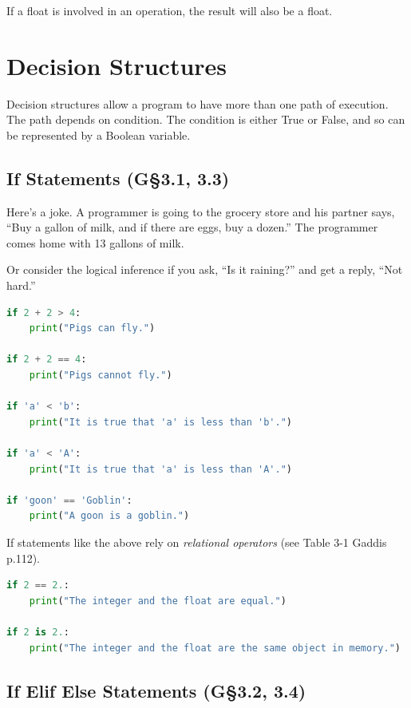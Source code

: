 If a float is involved in an operation, the result will also be a float. 


\section{Decision Structures}

Decision structures allow a program to have more than one path of execution. The path depends on condition. The condition is either True or False, and so can be represented by a Boolean variable.

\subsection{If Statements (G\S 3.1, 3.3)}

Here's a joke. A programmer is going to the grocery store and his partner says, ``Buy a gallon of milk, and if there are eggs, buy a dozen.''
The programmer comes home with 13 gallons of milk.

Or consider the logical inference if you ask, ``Is it raining?'' and get a reply, ``Not hard.'' 


\begin{lstlisting}[language = Python]
if 2 + 2 > 4:
    print("Pigs can fly.")
    
if 2 + 2 == 4:
    print("Pigs cannot fly.")
    
if 'a' < 'b':
    print("It is true that 'a' is less than 'b'.")
    
if 'a' < 'A':
    print("It is true that 'a' is less than 'A'.")
    
if 'goon' == 'Goblin':
    print("A goon is a goblin.") \end{lstlisting}
    

If statements like the above rely on \emph{relational operators} (see Table 3-1 Gaddis p.112).

\begin{lstlisting}[language = Python]
if 2 == 2.:
    print("The integer and the float are equal.")
    
if 2 is 2.:
    print("The integer and the float are the same object in memory.") \end{lstlisting}

\subsection{If Elif Else Statements (G\S 3.2, 3.4)}

